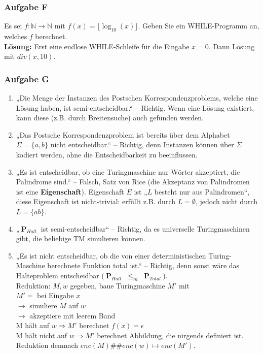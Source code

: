 \documentclass[a4paper,10pt]{article}
\newcommand{\f}[1]{\textbf{#1}}
\newcommand{\prob}[1]{\textbf{#1}}
\newcommand{\prspec}[1]{$~\prob{P}_{#1}~$}
\newcommand{\N}{\mathbb{N}}
\begin{document}
    \subsubsection*{Aufgabe F}
        Es sei $f:\N\to\N$ mit $f(x)=\lfloor\log_{10}(x)\rfloor$. Geben Sie ein WHILE-Programm an, welches $f$ berechnet. \\
        \textbf{Lösung:} Erst eine endlose WHILE-Schleife für die Eingabe $x=0$. Dann Lösung mit $div(x, 10)$.

    \subsubsection*{Aufgabe G}
        \begin{enumerate}
            \item „Die Menge der Instanzen des Postschen Korrespondenzproblems, welche eine Lösung haben, ist semi-entscheidbar.“ – Richtig. Wenn eine Lösung existiert, kann diese (z.B. durch Breitensuche) auch gefunden werden.

            \item „Das Postsche Korrespondenzproblem ist bereits über dem Alphabet $\Sigma = \{a,b\}$ nicht entscheidbar.“ – Richtig, denn Instanzen können über $\Sigma$ kodiert werden, ohne die Entscheidbarkeit zu beeinflussen.

            \item „Es ist entscheidbar, ob eine Turingmaschine nur Wörter akzeptiert, die Palindrome sind.“ – Falsch, Satz von Rice (die Akzeptanz von Palindromen ist eine \f{Eigenschaft}). Eigenschaft $E$ ist „$L$ besteht nur aus Palindromen“, diese Eigenschaft ist nicht-trivial: erfüllt z.B. durch $L = \emptyset$, jedoch nicht durch $L = \{ab\}$.

            \item „\prspec{Halt} ist semi-entscheidbar“ – Richtig, da es universelle Turingmaschinen gibt, die beliebige TM simulieren können.

            \item „Es ist nicht entscheidbar, ob die von einer deterministischen Turing-Maschine berechnete Funktion total ist.“ – Richtig, denn sonst wäre das Halteproblem entscheidbar (\prspec{Halt} $\leq_m$ \prspec{Total}). \\
            Reduktion: $M, w$ gegeben, baue Turingmaschine $M'$ mit \\
            $M' =$ bei Eingabe $x$ \\
            $\to$ simuliere $M$ auf $w$ \\
            $\to$ akzeptiere mit leerem Band \\
            M hält auf $w \Rightarrow M'$ berechnet $f(x)= \epsilon$ \\
            M hält nicht auf $w \Rightarrow M'$ berechnet Abbildung, die nirgends definiert ist. \\
            Reduktion demnach $enc(M)\#\#enc(w) \mapsto enc(M')$.


\end{enumerate}
\end{document}
